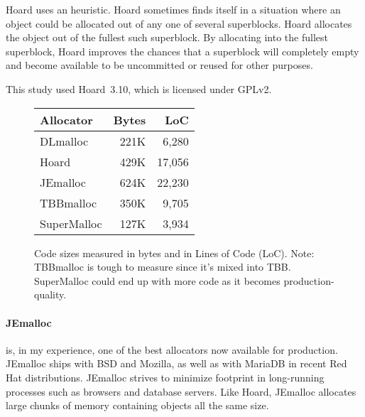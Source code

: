 \documentclass[natbib,sort&compress,10pt]{sigplanconf}
\begin{document}
Hoard uses an  heuristic.  Hoard sometimes
finds itself in a situation where an object could be allocated out of
any one of several superblocks.  Hoard allocates the object out of the
fullest such superblock. By allocating into the fullest superblock,
Hoard improves the chances that a superblock will completely empty and
become available to be uncommitted or reused for other purposes.

This study used Hoard~3.10, which is licensed under GPLv2.

\begin{figure}
\begin{center}
\begin{tabular}{lrr}
Allocator & Bytes        & LoC \\ \hline
 DLmalloc    \cite{Lea96}        & 221K &  6,280 \\
 Hoard       \cite{BergerMcBl00} & 429K & 17,056 \\
 JEmalloc    \cite{Evans06}      & 624K & 22,230 \\
 TBBmalloc   \cite{KukanovVo07}  & 350K &  9,705 \\
 SuperMalloc                     & 127K &  3,934 \\
\end{tabular}
\end{center}
\caption{Code sizes measured in bytes and in Lines of Code (LoC).
  Note: TBBmalloc is tough to measure since it's mixed into TBB.
  SuperMalloc could end up with more code as it becomes
  production-quality.}
\label{fig:codesize}
\end{figure}

{\paragraph{JEmalloc}} \cite{Evans06} is, in my experience, one of the
best allocators now available for production.  JEmalloc ships with BSD
and Mozilla, as well as with MariaDB in recent Red Hat distributions.
JEmalloc strives to minimize footprint in long-running processes such
as browsers and database servers.  Like Hoard, JEmalloc allocates
large chunks of memory containing objects all the same size.
\end{document}
